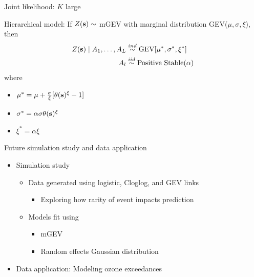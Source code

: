 \documentclass{beamer}
\begin{document}
\begin{frame}{Joint likelihood: $K$ large}
\begin{adjustwidth}{1em}{0em}
  Hierarchical model: If $Z(\mbox{\bf s}) \sim $ mGEV with marginal distribution GEV($\mu, \sigma, \xi$), then
  \begin{align*}
    Z(\mbox{\bf s}) \mid A_1, \ldots, A_L &\stackrel{ind}{\sim} \text{GEV}[\mu^*, \sigma^*, \xi^*] \\
    A_l &\stackrel{iid}{\sim} \text{Positive Stable}(\alpha)
  \end{align*}
  where
  \begin{itemize} \setlength{\itemsep}{0.25em}
    \item $\mu^* = \mu + \frac{ \sigma }{ \xi }[\theta(\mbox{\bf s})^\xi - 1]$
    \item $\sigma^* = \alpha \sigma \theta(\mbox{\bf s})^\xi$
    \item $\xi^* = \alpha \xi$
  \end{itemize}
\end{adjustwidth}
\end{frame}


\begin{frame}{Future simulation study and data application}
  \begin{itemize} \setlength{\itemsep}{1em}
    \item Simulation study \vspace{0.5em}
    \begin{itemize} \setlength{\itemsep}{0.5em}
      \item Data generated using logistic, Cloglog, and GEV links \vspace{0.25em}
      \begin{itemize}
        \item Exploring how rarity of event impacts prediction
      \end{itemize}
      \item Models fit using \vspace{0.25em}
      \begin{itemize} \setlength{\itemsep}{0.25em}
        \item mGEV
        \item Random effects Gaussian distribution
      \end{itemize}
    \end{itemize}
    \item Data application: Modeling ozone exceedances \vspace{0.5em}
  \end{itemize}
\end{frame}
\end{document}
